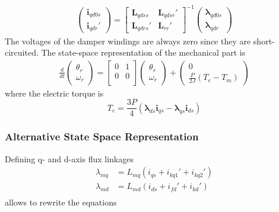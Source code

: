 %
\begin{align} 
   \begin{pmatrix}
    \mathbf{i}_{qd0s} \\
    \mathbf{i}_{qdr}'
  \end{pmatrix}
  = 
  \begin{bmatrix}
    \mathbf{L}_{qdss} & \mathbf{L}_{qdsr}' \\
    \mathbf{L}_{qdrs}' & \mathbf{L}_{rr}'    
  \end{bmatrix}^{-1}
  \begin{pmatrix}
    \boldsymbol{\lambda}_{qd0s} \\
    \boldsymbol{\lambda}_{qdr}
  \end{pmatrix}
\end{align}
%
The voltages of the damper windings are always zero since they are short-circuited. The state-space representation of the mechanical part is
%
\begin{align}
 \frac{d}{dt}
  \begin{pmatrix}
    \theta_r \\
    \omega_r
  \end{pmatrix}
  =
  \begin{bmatrix}
    0 & 1 \\
    0 & 0 \\
  \end{bmatrix}
  \begin{pmatrix}
    \theta_r \\
    \omega_r
  \end{pmatrix}
  + 
  \begin{pmatrix}
    0 \\
    \frac{P}{2J} \left( T_e - T_m \right)
  \end{pmatrix} 
\end{align}
%
where the electric torque is
%
\begin{equation}
  T_e = \frac{3P}{4} \left( \boldsymbol{\lambda}_{ds} \mathbf{i}_{qs} - \boldsymbol{\lambda}_{qs} \mathbf{i}_{ds} \right)
\end{equation}
%

\subsubsection{Alternative State Space Representation}
Defining q- and d-axis flux linkages 
%
\begin{align}
  \lambda_{mq} &= L_{mq} \left( i_{qs} + i_{kq1}' + i_{kq2}' \right) \\
  \lambda_{md} &= L_{md} \left( i_{ds} + i_{fd}' + i_{kd}' \right) \\
\end{align}
%
allows to rewrite the equations
